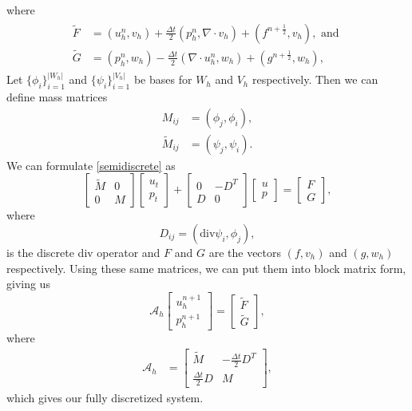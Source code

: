 \documentclass[11pt]{article}
\newcommand{\divv}{\mathrm{div}}
\begin{document}
where
\begin{eqnarray}
\begin{split}
\tilde{F} &= \left(u^n_h, v_h\right) +\frac{\Delta t}{2}\left(p^n_h,\nabla \cdot v_h\right)+\left(f^{n+\frac{1}{2}},v_h\right), \text{ and }\\
\tilde{G} &= \left(p^n_h,w_h\right) - \frac{\Delta t}{2}\left(\nabla \cdot u^n_h,w_h\right)+\left(g^{n+\frac{1}{2}},w_h\right),
\end{split}
\end{eqnarray}
 Let $\{\phi_i\}_{i=1}^{|W_h|}$ and $\{\psi_i\}_{i=1}^{|V_h|}$ be bases for $W_h$ and $V_h$ respectively. Then we can define mass matrices  %
\begin{equation}
\begin{split}
M_{ij} &= (\phi_j,\phi_i), \\
\tilde{M}_{ij} &= (\psi_j,\psi_i).
\end{split}
\end{equation}
We can formulate \eqref{semidiscrete} as
\begin{equation}
\begin{bmatrix}
\tilde{M} & 0\\
0 & M
\end{bmatrix} \begin{bmatrix}
u_t \\
p_t
\end{bmatrix} + \begin{bmatrix}
0 & -D^T \\
D & 0
\end{bmatrix} \begin{bmatrix}
u \\
p
\end{bmatrix} = \begin{bmatrix}
F \\
G
\end{bmatrix},
\end{equation} %
where
\begin{equation}
D_{ij} = (\divv \psi_i, \phi_j),
\end{equation}
 is the discrete div operator and $F$ and $G$ are the vectors $(f,v_h)$ and $(g,w_h)$ respectively. Using these same matrices, we can put them into block matrix form, giving us
\begin{equation}\label{FEcoeffoperator}
\mathscr{A}_h
\begin{bmatrix}
u^{n+1}_h \\
p^{n+1}_h
\end{bmatrix}
=
\begin{bmatrix}
\tilde{F}\\
\tilde{G}
\end{bmatrix},
\end{equation}
where
\begin{equation}\label{discretcoefop}
\begin{split}
\mathscr{A}_h &= \begin{bmatrix}
\tilde{M} & -\frac{\Delta t}{2}D^T \\
\frac{\Delta t}{2}D & M
\end{bmatrix},
\end{split}
\end{equation} which gives our fully discretized system.
\end{document}
